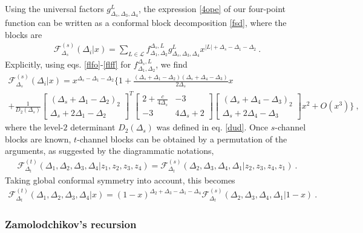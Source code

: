 \documentclass[12pt, a4paper, notitlepage, twoside]{report}
\numberwithin{equation}{section}
\theoremstyle{break}
\begin{document}
Using the universal factors $g^L_{\Delta_s,\Delta_3,\Delta_4}$, the expression \eqref{4ope} of our four-point function can be written as a conformal block decomposition \eqref{fsd}, where the blocks are 
\begin{align}
 \mathcal{F}^{(s)}_{\Delta_s}(\Delta_i|x) = \sum_{L\in\mathcal{L}} f_{\Delta_1,\Delta_2}^{\Delta_s,L} g^{L}_{\Delta_s,\Delta_3,\Delta_4}x^{|L|+\Delta_s-\Delta_1-\Delta_2}\ .
\label{gsd}
\end{align}
Explicitly, using eqs. \eqref{flfo}-\eqref{flff} for $f_{\Delta_1,\Delta_2}^{\Delta_s,L}$, we find 
\begin{multline}
 \mathcal{F}^{(s)}_{\Delta_s}(\Delta_i|x) 
= x^{\Delta_s - \Delta_1 - \Delta_2}\Bigg\{ 1 
+ \frac{(\Delta_s+\Delta_1-\Delta_2)(\Delta_s+\Delta_4-\Delta_3)}{2\Delta_s} x  
\\
+ \frac{1}{D_2(\Delta_s)}
\begin{bmatrix} (\Delta_s+\Delta_1-\Delta_2)_2 \\ \Delta_s+2\Delta_1-\Delta_2 \end{bmatrix}^T
\begin{bmatrix} 2+\frac{c}{4\Delta_s} & -3 \\ -3 & 4\Delta_s+2 \end{bmatrix}
\begin{bmatrix} (\Delta_s+\Delta_4-\Delta_3)_2 \\ \Delta_s+2\Delta_4-\Delta_3 \end{bmatrix}
 x^2 + O(x^3)\Bigg\}\ ,
\end{multline}
where the level-$2$ determinant $D_2(\Delta_s)$ was defined in eq. \eqref{dud}.
Once $s$-channel blocks are known, $t$-channel blocks can be obtained by a permutation of the arguments, as suggested by the diagrammatic notations,
\begin{align}
 \mathcal{F}^{(t)}_{\Delta_t}(\Delta_1,\Delta_2,\Delta_3,\Delta_4|z_1,z_2,z_3,z_4) = \mathcal{F}^{(s)}_{\Delta_t}(\Delta_2,\Delta_3,\Delta_4,\Delta_1|z_2,z_3,z_4,z_1)\ . 
\label{gtgs}
\end{align}
Taking global conformal symmetry into account, this becomes
\begin{align}
 \mathcal{F}^{(t)}_{\Delta_t}(\Delta_1,\Delta_2,\Delta_3,\Delta_4|x) = (1-x)^{\Delta_2+\Delta_3-\Delta_1-\Delta_4}\mathcal{F}^{(s)}_{\Delta_t}(\Delta_2,\Delta_3,\Delta_4,\Delta_1|1-x)\ .
\end{align}

\subsubsection{Zamolodchikov's recursion}
\end{document}
